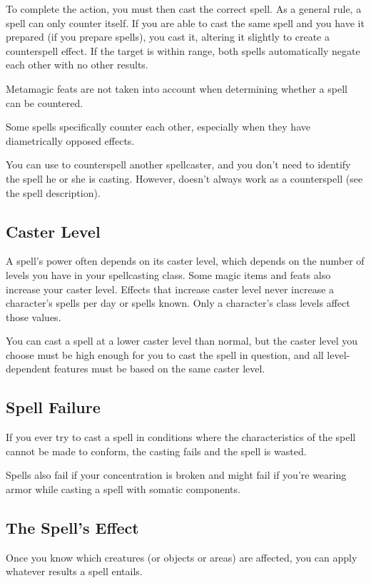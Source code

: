 To complete the action, you must then cast the correct spell. As a general rule, a spell can only counter itself. If you are able to cast the same spell and you have it prepared (if you prepare spells), you cast it, altering it slightly to create a counterspell effect. If the target is within range, both spells automatically negate each other with no other results.

 Metamagic feats are not taken into account when determining whether a spell can be countered.

 Some spells specifically counter each other, especially when they have diametrically opposed effects.

 You can use  to counterspell another spellcaster, and you don't need to identify the spell he or she is casting. However,  doesn't always work as a counterspell (see the spell description).

\subsection{Caster Level}
A spell's power often depends on its caster level, which depends on the number of levels you have in your spellcasting class. Some magic items and feats also increase your caster level. Effects that increase caster level never increase a character's spells per day or spells known. Only a character's class levels affect those values.

You can cast a spell at a lower caster level than normal, but the caster level you choose must be high enough for you to cast the spell in question, and all level-dependent features must be based on the same caster level.

\subsection{Spell Failure}
If you ever try to cast a spell in conditions where the characteristics of the spell cannot be made to conform, the casting fails and the spell is wasted.

Spells also fail if your concentration is broken and might fail if you're wearing armor while casting a spell with somatic components.

\subsection{The Spell's Effect}
Once you know which creatures (or objects or areas) are affected, you can apply whatever results a spell entails.

